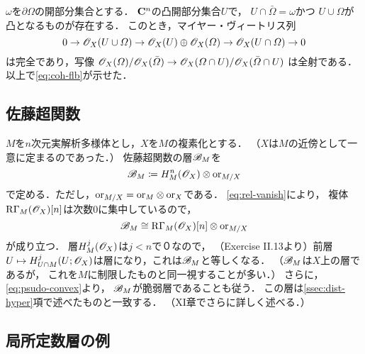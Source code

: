 \(\omega\)を\(\partial\varOmega\)の開部分集合とする．
\(\mathbf{C}^n\)の凸開部分集合\(U\)で，
\(U\cap\bar{\varOmega}=\omega\)かつ
\(U\cup \varOmega\)が凸となるものが存在する．
このとき，マイヤー・ヴィートリス列
\[
    0\to\mathscr{O}_X(U\cup\varOmega)
    \to\mathscr{O}_X(U)\oplus\mathscr{O}_X(\varOmega)
    \to\mathscr{O}_X(U\cap\varOmega)\to0
\]
は完全であり，写像
\(
    \mathscr{O}_X(\varOmega)/\mathscr{O}_X(\bar{\varOmega})
    \to
    \mathscr{O}_X(\varOmega\cap U)/\mathscr{O}_X(\bar{\varOmega}\cap U)
\)
は全射である．以上で\eqref{eq:coh-flb}が示せた．



\subsection{佐藤超関数}\label{ssec:sato}

\(M\)を\(n\)次元実解析多様体とし，\(X\)を\(M\)の複素化とする．
（\(X\)は\(M\)の近傍として一意に定まるのであった．）
佐藤超関数の層\(\mathscr{B}_M\)を
\begin{equation}
    \mathscr{B}_M\coloneqq
    H^n_M(\mathscr{O}_X)\otimes\mathord{\mathrm{or}}_{M/X}
\end{equation}
で定める．ただし，\(\mathord{\mathrm{or}}_{M/X}=\mathord{\mathrm{or}}_{M}\otimes\mathord{\mathrm{or}}_X\)である．
\eqref{eq:rel-vanish}により，
複体\(\mathop{\mathrm{R}\hspace{-0pt}\Gamma}\nolimits_M(\mathscr{O}_X)[n]\)は次数0に集中しているので，
\[
    \mathscr{B}_M\cong\mathop{\mathrm{R}\hspace{-0pt}\Gamma}\nolimits_M(\mathscr{O}_X)[n]\otimes \mathord{\mathrm{or}}_{M/X}
\]が成り立つ．
層\(H^j_M(\mathscr{O}_X)\)は\(j<n\)で０なので，
（Exercise II.13より）前層\(
    U\mapsto H^j_{U\cap M}(U;\mathscr{O}_X)
\)は層になり，これは\(\mathscr{B}_M\)と等しくなる．
（\(\mathscr{B}_M\)は\(X\)上の層であるが，
これを\(M\)に制限したものと同一視することが多い．）
さらに，\eqref{eq:psudo-convex}より，
\(\mathscr{B}_M\)が脆弱層であることも従う．
この層は\ref{ssec:dist-hyper}項で述べたものと一致する．
（XI章でさらに詳しく述べる．）


\subsection{局所定数層の例}

